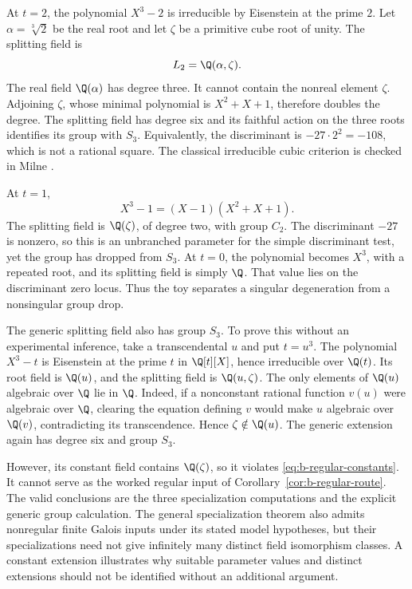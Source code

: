 At \(t=2\), the polynomial \(X^3-2\) is irreducible by Eisenstein at the prime \(2\). Let \(\alpha=\sqrt[3]{2}\) be the real root and let \(\zeta\) be a primitive cube root of unity. The splitting field is
\[
 L_2=\Q(\alpha,\zeta).
\]
The real field \(\Q(\alpha)\) has degree three. It cannot contain the nonreal element \(\zeta\). Adjoining \(\zeta\), whose minimal polynomial is \(X^2+X+1\), therefore doubles the degree. The splitting field has degree six and its faithful action on the three roots identifies its group with \(S_3\). Equivalently, the discriminant is \(-27\cdot2^2=-108\), which is not a rational square. The classical irreducible cubic criterion is checked in Milne \cite[Proposition 4.5 and Example 4.7]{Milne2022}.

At \(t=1\),
\[
 X^3-1=(X-1)(X^2+X+1).
\]
The splitting field is \(\Q(\zeta)\), of degree two, with group \(C_2\). The discriminant \(-27\) is nonzero, so this is an unbranched parameter for the simple discriminant test, yet the group has dropped from \(S_3\). At \(t=0\), the polynomial becomes \(X^3\), with a repeated root, and its splitting field is simply \(\Q\). That value lies on the discriminant zero locus. Thus the toy separates a singular degeneration from a nonsingular group drop.

The generic splitting field also has group \(S_3\). To prove this without an experimental inference, take a transcendental \(u\) and put \(t=u^3\). The polynomial \(X^3-t\) is Eisenstein at the prime \(t\) in \(\Q[t][X]\), hence irreducible over \(\Q(t)\). Its root field is \(\Q(u)\), and the splitting field is \(\Q(u,\zeta)\). The only elements of \(\Q(u)\) algebraic over \(\Q\) lie in \(\Q\). Indeed, if a nonconstant rational function \(v(u)\) were algebraic over \(\Q\), clearing the equation defining \(v\) would make \(u\) algebraic over \(\Q(v)\), contradicting its transcendence. Hence \(\zeta\notin\Q(u)\). The generic extension again has degree six and group \(S_3\).

However, its constant field contains \(\Q(\zeta)\), so it violates \eqref{eq:b-regular-constants}. It cannot serve as the worked regular input of Corollary~\ref{cor:b-regular-route}. The valid conclusions are the three specialization computations and the explicit generic group calculation. The general specialization theorem also admits nonregular finite Galois inputs under its stated model hypotheses, but their specializations need not give infinitely many distinct field isomorphism classes. A constant extension illustrates why suitable parameter values and distinct extensions should not be identified without an additional argument.

